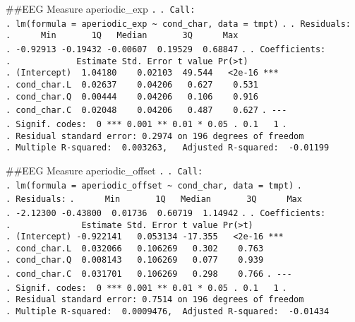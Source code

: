 \documentclass[
]{article}
\begin{document}
\#\#EEG Measure aperiodic\_exp \texttt{.} \texttt{.\ Call:}
\texttt{.\ lm(formula\ =\ aperiodic\_exp\ \textasciitilde{}\ cond\_char,\ data\ =\ tmpt)}
\texttt{.} \texttt{.\ Residuals:}
\texttt{.\ \ \ \ \ \ Min\ \ \ \ \ \ \ 1Q\ \ \ Median\ \ \ \ \ \ \ 3Q\ \ \ \ \ \ Max}
\texttt{.\ -0.92913\ -0.19432\ -0.00607\ \ 0.19529\ \ 0.68847}
\texttt{.} \texttt{.\ Coefficients:}
\texttt{.\ \ \ \ \ \ \ \ \ \ \ \ \ Estimate\ Std.\ Error\ t\ value\ Pr(\textgreater{}\textbar{}t\textbar{})}
\texttt{.\ (Intercept)\ \ 1.04180\ \ \ \ 0.02103\ \ 49.544\ \ \ \textless{}2e-16\ ***}
\texttt{.\ cond\_char.L\ \ 0.02637\ \ \ \ 0.04206\ \ \ 0.627\ \ \ \ 0.531}
\texttt{.\ cond\_char.Q\ \ 0.00444\ \ \ \ 0.04206\ \ \ 0.106\ \ \ \ 0.916}
\texttt{.\ cond\_char.C\ \ 0.02048\ \ \ \ 0.04206\ \ \ 0.487\ \ \ \ 0.627}
\texttt{.\ -\/-\/-}
\texttt{.\ Signif.\ codes:\ \ 0\ \textquotesingle{}***\textquotesingle{}\ 0.001\ \textquotesingle{}**\textquotesingle{}\ 0.01\ \textquotesingle{}*\textquotesingle{}\ 0.05\ \textquotesingle{}.\textquotesingle{}\ 0.1\ \textquotesingle{}\ \textquotesingle{}\ 1}
\texttt{.}
\texttt{.\ Residual\ standard\ error:\ 0.2974\ on\ 196\ degrees\ of\ freedom}
\texttt{.\ Multiple\ R-squared:\ \ 0.003263,\ \ \ Adjusted\ R-squared:\ \ -0.01199}

\#\#EEG Measure aperiodic\_offset \texttt{.} \texttt{.\ Call:}
\texttt{.\ lm(formula\ =\ aperiodic\_offset\ \textasciitilde{}\ cond\_char,\ data\ =\ tmpt)}
\texttt{.} \texttt{.\ Residuals:}
\texttt{.\ \ \ \ \ \ Min\ \ \ \ \ \ \ 1Q\ \ \ Median\ \ \ \ \ \ \ 3Q\ \ \ \ \ \ Max}
\texttt{.\ -2.12300\ -0.43800\ \ 0.01736\ \ 0.60719\ \ 1.14942}
\texttt{.} \texttt{.\ Coefficients:}
\texttt{.\ \ \ \ \ \ \ \ \ \ \ \ \ \ Estimate\ Std.\ Error\ t\ value\ Pr(\textgreater{}\textbar{}t\textbar{})}
\texttt{.\ (Intercept)\ -0.922141\ \ \ 0.053134\ -17.355\ \ \ \textless{}2e-16\ ***}
\texttt{.\ cond\_char.L\ \ 0.032066\ \ \ 0.106269\ \ \ 0.302\ \ \ \ 0.763}
\texttt{.\ cond\_char.Q\ \ 0.008143\ \ \ 0.106269\ \ \ 0.077\ \ \ \ 0.939}
\texttt{.\ cond\_char.C\ \ 0.031701\ \ \ 0.106269\ \ \ 0.298\ \ \ \ 0.766}
\texttt{.\ -\/-\/-}
\texttt{.\ Signif.\ codes:\ \ 0\ \textquotesingle{}***\textquotesingle{}\ 0.001\ \textquotesingle{}**\textquotesingle{}\ 0.01\ \textquotesingle{}*\textquotesingle{}\ 0.05\ \textquotesingle{}.\textquotesingle{}\ 0.1\ \textquotesingle{}\ \textquotesingle{}\ 1}
\texttt{.}
\texttt{.\ Residual\ standard\ error:\ 0.7514\ on\ 196\ degrees\ of\ freedom}
\texttt{.\ Multiple\ R-squared:\ \ 0.0009476,\ \ Adjusted\ R-squared:\ \ -0.01434}
\end{document}
